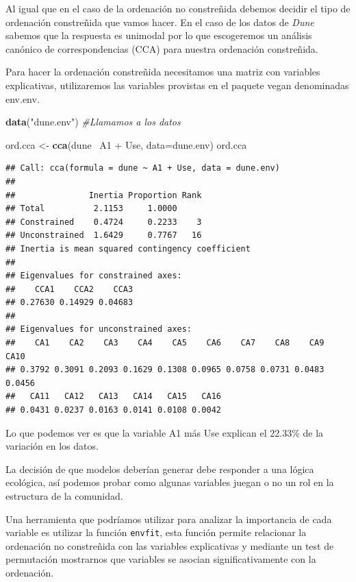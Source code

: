 \documentclass[]{book}
\newenvironment{Shaded}{\begin{snugshade}}{\end{snugshade}}
\newcommand{\KeywordTok}[1]{\textcolor[rgb]{0.13,0.29,0.53}{\textbf{{#1}}}}
\newcommand{\DataTypeTok}[1]{\textcolor[rgb]{0.13,0.29,0.53}{{#1}}}
\newcommand{\StringTok}[1]{\textcolor[rgb]{0.31,0.60,0.02}{{#1}}}
\newcommand{\CommentTok}[1]{\textcolor[rgb]{0.56,0.35,0.01}{\textit{{#1}}}}
\newcommand{\NormalTok}[1]{{#1}}
\begin{document}
Al igual que en el caso de la ordenación no constreñida debemos decidir
el tipo de ordenación constreñida que vamos hacer. En el caso de los
datos de \emph{Dune} sabemos que la respuesta es unimodal por lo que
escogeremos un análisis canónico de correspondencias (CCA) para nuestra
ordenación constreñida.

Para hacer la ordenación constreñida necesitamos una matriz con
variables explicativas, utilizaremos las variables provistas en el
paquete vegan denominadas env.env.

\begin{Shaded}
\begin{Highlighting}[]
\KeywordTok{data}\NormalTok{(}\StringTok{"dune.env"}\NormalTok{) }\CommentTok{#Llamamos a los datos}

\NormalTok{ord.cca <-}\StringTok{ }\KeywordTok{cca}\NormalTok{(dune~}\StringTok{ }\NormalTok{A1 +}\StringTok{ }\NormalTok{Use, }\DataTypeTok{data=}\NormalTok{dune.env)}
\NormalTok{ord.cca}
\end{Highlighting}
\end{Shaded}

\begin{verbatim}
## Call: cca(formula = dune ~ A1 + Use, data = dune.env)
## 
##               Inertia Proportion Rank
## Total          2.1153     1.0000     
## Constrained    0.4724     0.2233    3
## Unconstrained  1.6429     0.7767   16
## Inertia is mean squared contingency coefficient 
## 
## Eigenvalues for constrained axes:
##    CCA1    CCA2    CCA3 
## 0.27630 0.14929 0.04683 
## 
## Eigenvalues for unconstrained axes:
##    CA1    CA2    CA3    CA4    CA5    CA6    CA7    CA8    CA9   CA10 
## 0.3792 0.3091 0.2093 0.1629 0.1308 0.0965 0.0758 0.0731 0.0483 0.0456 
##   CA11   CA12   CA13   CA14   CA15   CA16 
## 0.0431 0.0237 0.0163 0.0141 0.0108 0.0042
\end{verbatim}

Lo que podemos ver es que la variable A1 más Use explican el 22.33\% de
la variación en los datos.

La decisión de que modelos deberían generar debe responder a una lógica
ecológica, así podemos probar como algunas variables juegan o no un rol
en la estructura de la comunidad.

Una herramienta que podríamos utilizar para analizar la importancia de
cada variable es utilizar la función \texttt{envfit}, esta función
permite relacionar la ordenación no constreñida con las variables
explicativas y mediante un test de permutación mostrarnos que variables
se asocian significativamente con la ordenación.
\end{document}
